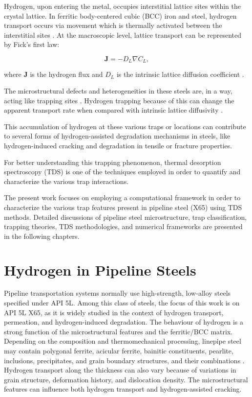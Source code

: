 \documentclass[a4paper,12pt,oneside]{report}
\begin{document}
Hydrogen, upon entering the metal, occupies interstitial lattice sites within the crystal lattice. In ferritic body-centered cubic (BCC) iron and steel, hydrogen transport occurs via movement which is thermally activated between the interstitial sites \cite{Chen2025,Darken1949}. At the macroscopic level, lattice transport can be represented by Fick's first law:

\begin{equation}
\mathbf{J} = -D_L\nabla C_L,
\label{eq:fick_first_law}
\end{equation}

where $\mathbf{J}$ is the hydrogen flux and $D_L$ is the intrinsic lattice diffusion coefficient \cite{Fallahmohammadi2013,Legrand2015}.

The microstructural defects and heterogeneities in these steels are, in a way, acting like trapping sites \cite{Darken1949,Oriani1970,Krom2000}. Hydrogen trapping because of this can change the apparent transport rate when compared with intrinsic lattice diffusivity \cite{Fallahmohammadi2013,McNabb1963}.

This accumulation of hydrogen at these various traps or locations can contribute to several forms of hydrogen-assisted degradation mechanisms in steels, like hydrogen-induced cracking and degradation in tensile or fracture properties.

For better understanding this trapping phenomenon, thermal desorption spectroscopy (TDS) is one of the techniques employed in order to quantify and characterize the various trap interactions.

The present work focuses on employing a computational framework in order to characterize the various trap features present in pipeline steel (X65) using TDS methods. Detailed discussions of pipeline steel microstructure, trap classification, trapping theories, TDS methodologies, and numerical frameworks are presented in the following chapters.


\section{Hydrogen in Pipeline Steels}

Pipeline transportation systems normally use high-strength, low-alloy steels specified under API 5L. Among this class of steels, the focus of this work is on API 5L X65, as it is widely studied in the context of hydrogen transport, permeation, and hydrogen-induced degradation. The behaviour of hydrogen is a strong function of the microstructural features and the ferritic/BCC matrix. Depending on the composition and thermomechanical processing, linepipe steel may contain polygonal ferrite, acicular ferrite, bainitic constituents, pearlite, inclusions, precipitates, and grain boundary structures, and their combinations \cite{Ohaeri2018,Jack2020,Koren2024b}. Hydrogen transport along the thickness can also vary because of variations in grain structure, deformation history, and dislocation density. The microstructural features can influence both hydrogen transport and hydrogen-assisted cracking.
\end{document}
